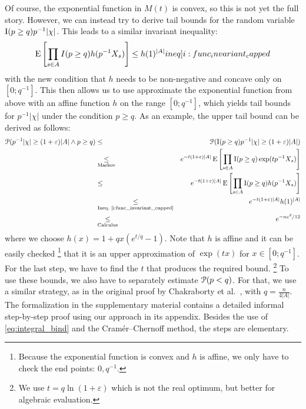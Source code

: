 Of course, the exponential function in $M(t)$ is convex, so this is not yet the full story.
However, we can instead try to derive tail bounds for the random variable $\operatorname{\mathrm{I}}(p \geq q) p^{-1} |\chi|$.
This leads to a similar invariant inequality:
\begin{align}
  \expect \left[ \prod_{s \in A} I(p \geq q) h(p^{-1} X_s) \right] \leq h(1)^{|A|} \label[ineq]{i:func_invariant_capped}
\end{align}
with the new condition that $h$ needs to be non-negative and concave only on $[0;q^{-1}]$.
This then allows us to use approximate the exponential function from above with an affine function $h$ on the range $[0;q^{-1}]$, which yields tail bounds for $p^{-1} |\chi|$ under the condition $p \geq q$. As an example, the upper tail bound can be derived as follows:
\begin{eqnarray*}
  \prob( p^{-1} |\chi| \geq (1+\varepsilon) |A| \wedge p \geq q) & \leq & %
  \prob( \indicat(p \geq q) p^{-1} |\chi| \geq (1+\varepsilon) |A|) \\
  & \underset{\textrm{Markov}}{\leq} & e^{-t(1+\varepsilon) |A|} \expect \left[ \prod_{s \in A} \indicat(p \geq q) \exp( t p^{-1} X_s) \right] \\
  & \leq & e^{-t(1+\varepsilon) |A|} \expect \left[ \prod_{s \in A} \indicat(p \geq q) h(p^{-1} X_s) \right] \\
  & \underset{\textrm{Ineq.~\ref{i:func_invariant_capped}}}{\leq} & e^{-t(1+\varepsilon) |A|} h(1)^{|A|} \\
  & \underset{\textrm{Calculus}}{\leq} & e^{-n\varepsilon^2 / 12}
\end{eqnarray*}
where we choose $h(x) = 1+qx (e^{t/q}-1)$.
Note that $h$ is affine and it can be easily checked%
\footnote{Because the exponential function is convex and $h$ is affine, we only have to check the end points: $0, q^{-1}$.}
that it is an upper approximation of $\exp(tx)$ for $x \in [0;q^{-1}]$.
For the last step, we have to find the $t$ that produces the required bound.%
\footnote{We use $t = q \ln(1+\varepsilon)$ which is not the real optimum, but better for algebraic evaluation.}
To use these bounds, we also have to separately estimate $\operatorname{\mathcal P}(p < q)$.
For that, we use a similar strategy, as in the original proof by Chakraborty et al.~\cite{chakraborty2023}, with $q = \frac{n}{4 |A|}$.
The formalization in the supplementary material contains a detailed informal step-by-step proof using our approach in its appendix.
Besides the use of \cref{eq:integral_bind} and the Cram\'er--Chernoff method, the steps are elementary.

